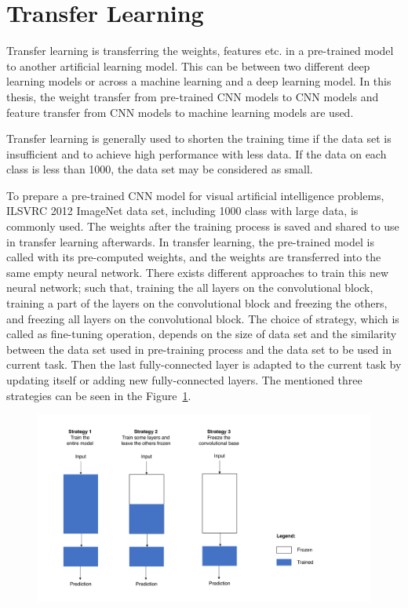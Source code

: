 \section{Transfer Learning} \label{CH3:transfer_learning}

Transfer learning is transferring the weights, features etc. in a pre-trained model to another artificial learning model. This can be between two different deep learning models or across a machine learning and a deep learning model. In this thesis, the weight transfer from pre-trained CNN models to CNN models and feature transfer from CNN models to machine learning models are used.

Transfer learning is generally used to shorten the training time if the data set is insufficient and to achieve high performance with less data. If the data on each class is less than 1000, the data set may be considered as small. 

To prepare a pre-trained CNN model for visual artificial intelligence problems, ILSVRC 2012 ImageNet \cite{imagenet} data set, including 1000 class with large data, is commonly used. The weights after the training process is saved and shared to use in transfer learning afterwards. In transfer learning, the pre-trained model is called with its pre-computed weights, and the weights are transferred into the same empty neural network. There exists different approaches to train this new neural network; such that, training the all layers on the convolutional block, training a part of the layers on the convolutional block and freezing the others, and freezing all layers on the convolutional block. The choice of strategy, which is called as fine-tuning operation, depends on the size of data set and the similarity between the data set used in pre-training process and the data set to be used in current task. Then the last fully-connected layer is adapted to the current task by updating itself or adding new fully-connected layers. The mentioned three strategies can be seen in the Figure~\ref{fig:pretrain_strategies}.

\begin{figure}[h]
	\centering
	\includegraphics[width=.8\linewidth]{fig/pretrain_strategies.png}
	\vspace*{1mm}
	\label{fig:pretrain_strategies}
\end{figure}

